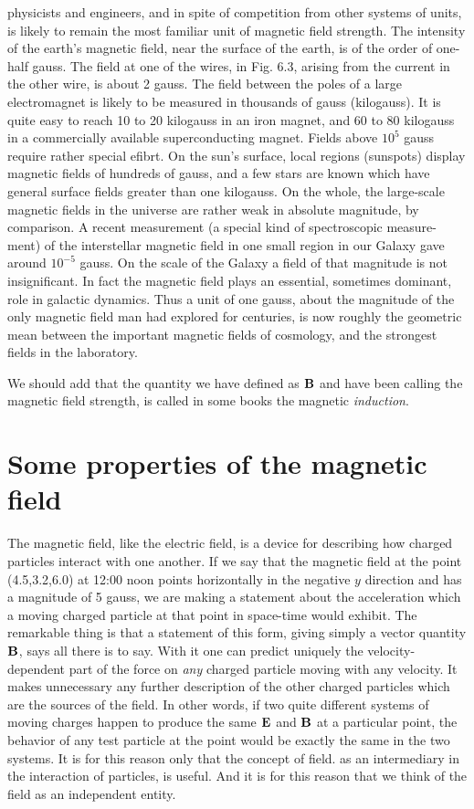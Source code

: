 physicists and engineers, and in spite of competition from other systems
of units, is likely to remain the most familiar unit of magnetic
field strength. The intensity of the earth's magnetic field, near the
surface of the earth, is of the order of one-half gauss. The field at
one of the wires, in Fig. 6.3, arising from the current in the other wire,
is about 2 gauss. The field between the poles of a large electromagnet
is likely to be measured in thousands of gauss (kilogauss). It is quite
easy to reach 10 to 20 kilogauss in an iron magnet, and 60 to 80 kilogauss
in a commercially available superconducting magnet. Fields
above $10^5$ gauss require rather special efibrt. On the sun's surface,
local regions (sunspots) display magnetic fields of hundreds of gauss,
and a few stars are known which have general surface fields greater
than one kilogauss. On the whole, the large-scale magnetic fields in
the universe are rather weak in absolute magnitude, by comparison.
A recent measurement (a special kind of spectroscopic measure-
ment) of the interstellar magnetic field in one small region in our
Galaxy gave around $10^{-5}$ gauss. On the scale of the Galaxy a field
of that magnitude is not insignificant. In fact the magnetic field plays
an essential, sometimes dominant, role in galactic dynamics. Thus a
unit of one gauss, about the magnitude of the only magnetic field
man had explored for centuries, is now roughly the geometric mean
between the important magnetic fields of cosmology, and the strongest
fields in the laboratory.

We should add that the quantity we have defined as $\mathbf{B}$ and have
been calling the magnetic field strength, is called in some books the
magnetic \emph{induction}.

\section{Some properties of the magnetic field}

The magnetic field, like the electric field, is a device for describing
how charged particles interact with one another. If we say that the
magnetic field at the point (4.5,3.2,6.0) at 12:00 noon points horizontally
in the negative $y$ direction and has a magnitude of 5 gauss,
we are making a statement about the acceleration which a moving
charged particle at that point in space-time would exhibit. The remarkable
thing is that a statement of this form, giving simply a vector
quantity $\mathbf{B}$, says all there is to say. With it one can predict uniquely
the velocity-dependent part of the force on \emph{any} charged particle moving
with any velocity. It makes unnecessary any further description
of the other charged particles which are the sources of the field. In
other words, if two quite different systems of moving charges happen
to produce the same $\mathbf{E}$ and $\mathbf{B}$ at a particular point, the behavior of
any test particle at the point would be exactly the same in the two
systems. It is for this reason only that the concept of field. as an intermediary
in the interaction of particles, is useful. And it is for this
reason that we think of the field as an independent entity.

